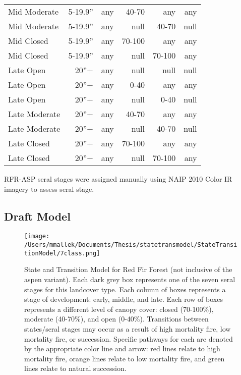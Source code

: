 \begin{table}[]
\begin{tabular}{@{}lrrrrr@{}}
Mid Moderate     & 5-19.9''        & any & 40-70  & any    & any  \\
Mid Moderate     & 5-19.9''        & any & null   & 40-70  & null \\
Mid Closed       & 5-19.9''        & any & 70-100 & any    & any  \\
Mid Closed       & 5-19.9''        & any & null   & 70-100 & any  \\
Late Open        & 20''+           & any & null   & null   & null \\
Late Open        & 20''+           & any & 0-40   & any    & any  \\
Late Open        & 20''+           & any & null   & 0-40   & null \\
Late Moderate    & 20''+           & any & 40-70  & any    & any  \\
Late Moderate    & 20''+           & any & null   & 40-70  & null \\
Late Closed      & 20''+           & any & 70-100 & any    & any  \\
Late Closed      & 20''+           & any & null   & 70-100 & any  \\ \bottomrule
\end{tabular}
\end{table}

RFR-ASP seral stages were assigned manually using NAIP 2010 Color IR imagery to assess seral stage.

\subsection*{Draft Model}
\begin{figure}[htbp]
\centering
\texttt{[image: /Users/mmallek/Documents/Thesis/statetransmodel/StateTransitionModel/7class.png]}
\caption{State and Transition Model for Red Fir Forest (not inclusive of the aspen variant). Each dark grey box represents one of the seven seral stages for this landcover type. Each column of boxes represents a stage of development: early, middle, and late. Each row of boxes represents a different level of canopy cover: closed (70-100\%), moderate (40-70\%), and open (0-40\%). Transitions between states/seral stages may occur as a result of high mortality fire, low mortality fire, or succession. Specific pathways for each are denoted by the appropriate color line and arrow: red lines relate to high mortality fire, orange lines relate to low mortality fire, and green lines relate to natural succession.} 
\label{transmodel_rfr}
\end{figure}

